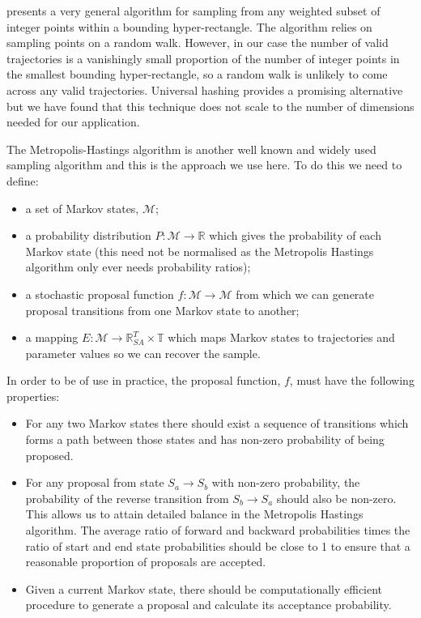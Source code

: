 \documentclass{article}
\begin{document}
\citet{baumert2009discrete} presents a very general algorithm for sampling from any weighted subset of integer points within a bounding hyper-rectangle. The algorithm relies on sampling points on a random walk. However, in our case the number of valid trajectories is a vanishingly small proportion of the number of integer points in the smallest bounding hyper-rectangle, so a random walk is unlikely to come across any valid trajectories. Universal hashing \citep{meel2016constrained} provides a promising alternative but we have found that this technique does not scale to the number of dimensions needed for our application.

The Metropolis-Hastings algorithm is another well known and widely used sampling algorithm and this is the approach we use here. To do this we need to define:
\begin{itemize}
\item a set of Markov states, $\mathcal{M}$;

\item a probability distribution $P: \mathcal{M} \to \mathbb{R}$ which gives the probability of each Markov state (this need not be normalised as the Metropolis Hastings algorithm only ever needs probability ratios);

\item a stochastic proposal function $f:\mathcal{M} \to \mathcal{M}$ from which we can generate proposal transitions from one Markov state to another;

\item a mapping $E:\mathcal{M} \to \mathbb{R}^T_{SA} \times \mathbb{T}$ which maps Markov states to trajectories and parameter values so we can recover the sample.
\end{itemize}

In order to be of use in practice, the proposal function, $f$, must have the following properties:
\begin{itemize}
	\item For any two Markov states there should exist a sequence of transitions which forms a path between those states and has non-zero probability of being proposed.
	
	\item For any proposal from state $S_a \to S_b$ with non-zero probability, the probability of the reverse transition from $S_b \to S_a$ should also be non-zero. This allows us to attain detailed balance in the Metropolis Hastings algorithm. The average ratio of forward and backward probabilities times the ratio of start and end state probabilities should be close to 1 to ensure that a reasonable proportion of proposals are accepted.
	
	\item Given a current Markov state, there should be computationally efficient procedure to generate a proposal and calculate its acceptance probability. 
\end{itemize}
\end{document}
